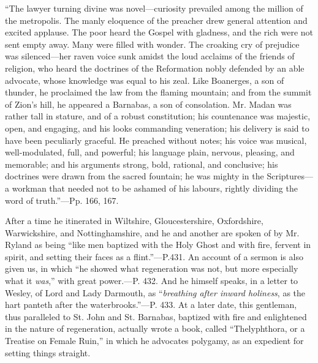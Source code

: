 ``The
lawyer turning divine was novel—curiosity prevailed among the
million of the metropolis. The manly eloquence of the preacher drew
general attention and excited applause. The poor heard the Gospel with
gladness, and the rich were not sent empty away. Many were filled with
wonder. The croaking cry of prejudice was silenced—her raven voice
sunk amidst the loud acclaims of the friends of religion, who heard
the doctrines of the Reformation nobly defended by an able advocate,
whose knowledge was equal to his zeal. Like Boanerges, a son of
thunder, he proclaimed the law from the flaming mountain; and from the
summit of Zion's hill, he
appeared a Barnabas, a son of consolation. Mr. Madan was rather tall
in stature, and of a robust constitution; his countenance was
majestic, open, and engaging, and his looks commanding veneration; his
delivery is said to have been peculiarly graceful. He preached without
notes; his voice was musical, well-modulated, full, and powerful; his
language plain, nervous, pleasing, and memorable; and his arguments
strong, bold, rational, and conclusive; his doctrines were drawn from
the sacred fountain; he was mighty in the Scriptures—a workman that
needed not to be ashamed of his labours, rightly dividing the word of
truth.''—Pp. 166, 167.

After a time he itinerated in Wiltshire,
Gloucestershire, Oxfordshire, Warwickshire, and Nottinghamshire, and
he and another are spoken of by Mr. Ryland as being ``like men baptized
with the Holy Ghost and with fire, fervent in spirit, and setting
their faces as a flint.''—P.431. An account of a sermon is also given
us, in which ``he showed what regeneration was not, but more especially
what it \emph{was},'' with great power.—P. 432. And he himself
speaks, in a letter to Wesley, of Lord and Lady Darmouth, as ``\emph{breathing
after inward holiness}, as the hart panteth after the waterbrooks.''—P.
433. At a later date, this gentleman, thus paralleled to St. John and
St. Barnabas, baptized with fire and enlightened in the nature of
regeneration, actually wrote a book, called ``Thelyphthora, or a
Treatise on Female Ruin,'' in which he advocates polygamy, as an
expedient for setting things straight.

